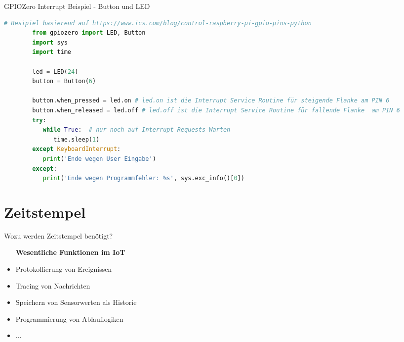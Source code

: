 \begin{frame}[fragile]{GPIOZero Interrupt Beispiel - Button und LED}
  \begin{lstlisting}[language=Python, gobble=8]
        # Besipiel basierend auf https://www.ics.com/blog/control-raspberry-pi-gpio-pins-python
        from gpiozero import LED, Button
        import sys
        import time

        led = LED(24)
        button = Button(6)

        button.when_pressed = led.on # led.on ist die Interrupt Service Routine für steigende Flanke am PIN 6
        button.when_released = led.off # led.off ist die Interrupt Service Routine für fallende Flanke  am PIN 6
        try:
           while True:  # nur noch auf Interrupt Requests Warten
              time.sleep(1)
        except KeyboardInterrupt:
           print('Ende wegen User Eingabe')
        except:
           print('Ende wegen Programmfehler: %s', sys.exc_info()[0])

        \end{lstlisting}

\end{frame}


\section{Zeitstempel}

\begin{frame}{Wozu werden Zeitstempel benötigt?}
    \begin{itemize}
        \setlength{\itemindent}{1.9in}
        \item [\textbf{Wesentliche Funktionen im IoT}]
    \end{itemize}

    \begin{itemize}
        \item Protokollierung von Ereignissen
        \item Tracing von Nachrichten
        \item Speichern von Sensorwerten als Historie
        \item Programmierung von Ablauflogiken
        \item ...
     \end{itemize}
\end{frame}


